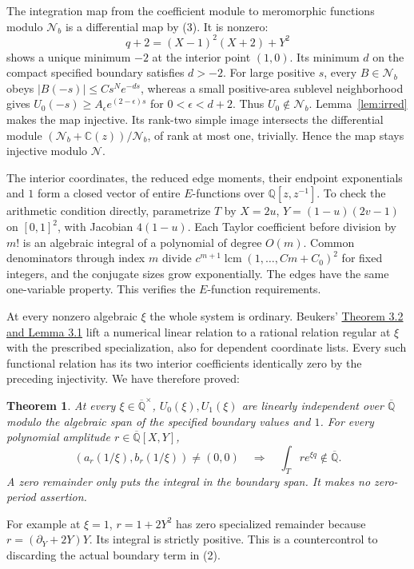 \documentclass[11pt]{article}
\newtheorem{theorem}{Theorem}
\newcommand{\Q}{\mathbb Q}
\newcommand{\Qb}{\overline{\mathbb Q}}
\newcommand{\C}{\mathbb C}
\begin{document}
The integration map from the coefficient module to meromorphic functions
modulo $\mathcal N_b$ is a differential map by (3). It is nonzero:
\[
 q+2=(X-1)^2(X+2)+Y^2
\]
shows a unique minimum $-2$ at the interior point $(1,0)$. Its minimum $d$
on the compact specified boundary satisfies $d>-2$. For large positive $s$,
every $B\in\mathcal N_b$ obeys $|B(-s)|\le Cs^N e^{-ds}$, whereas a small
positive-area sublevel neighborhood gives
$U_0(-s)\ge A_\epsilon e^{(2-\epsilon)s}$ for $0<\epsilon<d+2$.
Thus $U_0\notin\mathcal N_b$. Lemma~\ref{lem:irred} makes the map injective.
Its rank-two simple image intersects the differential module
$(\mathcal N_b+\C(z))/\mathcal N_b$, of rank at most one, trivially.
Hence the map stays injective modulo $\mathcal N$.

The interior coordinates, the reduced edge moments, their endpoint
exponentials and $1$ form a closed vector of entire $E$-functions over
$\Q[z,z^{-1}]$. To check the arithmetic condition directly, parametrize
$T$ by $X=2u$, $Y=(1-u)(2v-1)$ on $[0,1]^2$, with Jacobian $4(1-u)$.
Each Taylor coefficient before division by $m!$ is an algebraic integral
of a polynomial of degree $O(m)$. Common denominators through index $m$
divide $c^{m+1}\operatorname{lcm}(1,\ldots,Cm+C_0)^2$ for fixed integers,
and the conjugate sizes grow exponentially. The edges have the same
one-variable property. This verifies the $E$-function requirements.

At every nonzero algebraic $\xi$ the whole system is ordinary. Beukers'
\href{https://arxiv.org/html/math/0405549}{Theorem 3.2 and Lemma 3.1}
lift a numerical linear relation to a rational relation regular at $\xi$
with the prescribed specialization, also for dependent coordinate lists.
Every such functional relation has its two interior coefficients identically
zero by the preceding injectivity. We have therefore proved:

\begin{theorem}\label{thm:linear}
At every $\xi\in\Qb^\times$, $U_0(\xi),U_1(\xi)$ are linearly independent
over $\Qb$ modulo the algebraic span of the specified boundary values and
$1$. For every polynomial amplitude $r\in\Qb[X,Y]$,
\[
 (a_r(1/\xi),b_r(1/\xi))\ne(0,0)
 \quad\Longrightarrow\quad \int_T r e^{\xi q}\notin\Qb.
\]
A zero remainder only puts the integral in the boundary span. It makes
no zero-period assertion.
\end{theorem}

For example at $\xi=1$, $r=1+2Y^2$ has zero specialized remainder because
$r=(\partial_Y+2Y)Y$. Its integral is strictly positive. This is a
countercontrol to discarding the actual boundary term in (2).
\end{document}
